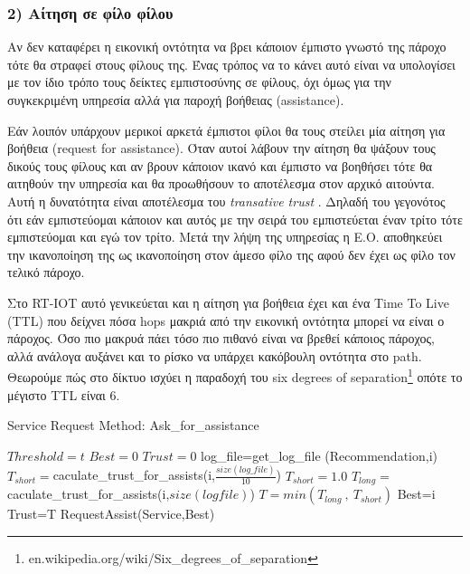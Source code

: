 \subsubsection{2) Αίτηση σε φίλο φίλου}

Αν δεν καταφέρει η εικονική οντότητα να βρει κάποιον έμπιστο γνωστό της πάροχο τότε θα στραφεί στους φίλους της. Ένας τρόπος να το κάνει αυτό είναι να υπολογίσει με τον ίδιο τρόπο τους δείκτες εμπιστοσύνης σε φίλους, όχι όμως για την συγκεκριμένη υπηρεσία αλλά για παροχή βοήθειας (assistance).

 Εάν λοιπόν υπάρχουν μερικοί αρκετά έμπιστοι φίλοι θα τους στείλει μία αίτηση για βοήθεια (request for assistance). Όταν αυτοί λάβουν την αίτηση θα ψάξουν τους δικούς τους φίλους και αν βρουν κάποιον ικανό και έμπιστο να βοηθήσει τότε θα αιτηθούν την υπηρεσία και θα προωθήσουν το αποτέλεσμα στον αρχικό αιτούντα. Αυτή η δυνατότητα είναι αποτέλεσμα του \textit{transative trust}\cite{Josang}
 . Δηλαδή του γεγονότος ότι εάν εμπιστεύομαι κάποιον και αυτός με την σειρά του εμπιστεύεται έναν τρίτο τότε εμπιστεύομαι και εγώ τον τρίτο. Μετά την λήψη της υπηρεσίας η Ε.Ο. αποθηκεύει την ικανοποίηση της ως ικανοποίηση στον άμεσο φίλο της αφού δεν έχει ως φίλο τον τελικό πάροχο. 

Στο RT-IOT αυτό γενικεύεται και η αίτηση για βοήθεια έχει και ένα Time To Live (TTL) που δείχνει πόσα hops μακριά από την εικονική οντότητα μπορεί να είναι ο πάροχος. Όσο πιο μακρυά πάει τόσο πιο πιθανό είναι να βρεθεί κάποιος πάροχος, αλλά ανάλογα αυξάνει και το ρίσκο να υπάρχει κακόβουλη οντότητα στο path. Θεωρούμε πώς στο δίκτυο ισχύει η παραδοχή του six degrees of separation\footnote{
en.wikipedia.org/wiki/Six\_degrees\_of\_separation} οπότε το μέγιστο TTL είναι 6.


\begin{algorithm}
\caption{Service Request Method: Ask\_for\_assistance}
\label{Service Request 2}
\begin{algorithmic}[1]
\State $Threshold = t$
\State $Best = 0$
\State $Trust = 0$
\State log\_file=get\_log\_file (Recommendation,i)
\State $T_{short}=$caculate\_trust\_for\_assists(i,$\frac{size \left(log\_file\right)}{10}$)
   \Else \State $T_{short}=1.0$
   \EndIf
\State $T_{long}=$caculate\_trust\_for\_assists(i,$size \left(log file\right)$)
\State $ T = min(T_{long} \  , \  T_{short})$
	\State Best=i
	\State Trust=T
\EndIf
\EndFor
{}
	\State RequestAssist(Service,Best)
\EndIf
\EndProcedure
\end{algorithmic}
\end{algorithm}
\newpage

